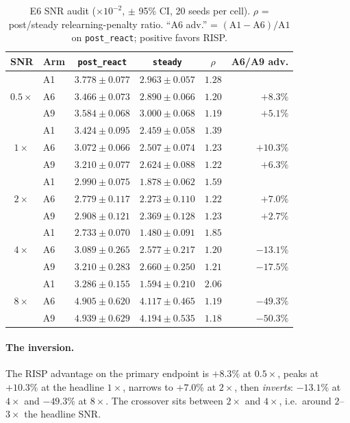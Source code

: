 \begin{table}[h]
\centering
\caption{E6 SNR audit ($\times 10^{-2}$, $\pm$ 95\% CI, 20 seeds per cell).
$\rho$ = post/steady relearning-penalty ratio. ``A6 adv.'' =
$(\text{A1}-\text{A6})/\text{A1}$ on \texttt{post\_react}; positive favors
RISP.}
\label{tab:dd5-e6}
\scriptsize
\begin{tabular}{clccc r}
\toprule
SNR & Arm & \texttt{post\_react} & \texttt{steady} & $\rho$ & A6/A9 adv. \\
\midrule
\multirow{3}{*}{$0.5\times$}
& A1  & $3.778 \pm 0.077$ & $2.963 \pm 0.057$ & $1.28$ & \\
& A6  & $3.466 \pm 0.073$ & $2.890 \pm 0.066$ & $1.20$ & $+8.3\%$ \\
& A9  & $3.584 \pm 0.068$ & $3.000 \pm 0.068$ & $1.19$ & $+5.1\%$ \\
\midrule
\multirow{3}{*}{$1\times$}
& A1  & $3.424 \pm 0.095$ & $2.459 \pm 0.058$ & $1.39$ & \\
& A6  & $3.072 \pm 0.066$ & $2.507 \pm 0.074$ & $1.23$ & $+10.3\%$ \\
& A9  & $3.210 \pm 0.077$ & $2.624 \pm 0.088$ & $1.22$ & $+6.3\%$ \\
\midrule
\multirow{3}{*}{$2\times$}
& A1  & $2.990 \pm 0.075$ & $1.878 \pm 0.062$ & $1.59$ & \\
& A6  & $2.779 \pm 0.117$ & $2.273 \pm 0.110$ & $1.22$ & $+7.0\%$ \\
& A9  & $2.908 \pm 0.121$ & $2.369 \pm 0.128$ & $1.23$ & $+2.7\%$ \\
\midrule
\multirow{3}{*}{$4\times$}
& A1  & $2.733 \pm 0.070$ & $1.480 \pm 0.091$ & $1.85$ & \\
& A6  & $3.089 \pm 0.265$ & $2.577 \pm 0.217$ & $1.20$ & $-13.1\%$ \\
& A9  & $3.210 \pm 0.283$ & $2.660 \pm 0.250$ & $1.21$ & $-17.5\%$ \\
\midrule
\multirow{3}{*}{$8\times$}
& A1  & $3.286 \pm 0.155$ & $1.594 \pm 0.210$ & $2.06$ & \\
& A6  & $4.905 \pm 0.620$ & $4.117 \pm 0.465$ & $1.19$ & $-49.3\%$ \\
& A9  & $4.939 \pm 0.629$ & $4.194 \pm 0.535$ & $1.18$ & $-50.3\%$ \\
\bottomrule
\end{tabular}
\end{table}

\paragraph{The inversion.} The RISP advantage on the primary endpoint
is $+8.3\%$ at $0.5\times$, peaks at $+10.3\%$ at the headline $1\times$,
narrows to $+7.0\%$ at $2\times$, then \emph{inverts}: $-13.1\%$ at
$4\times$ and $-49.3\%$ at $8\times$. The crossover sits between $2\times$
and $4\times$, i.e.\ around $2$--$3\times$ the headline SNR.

